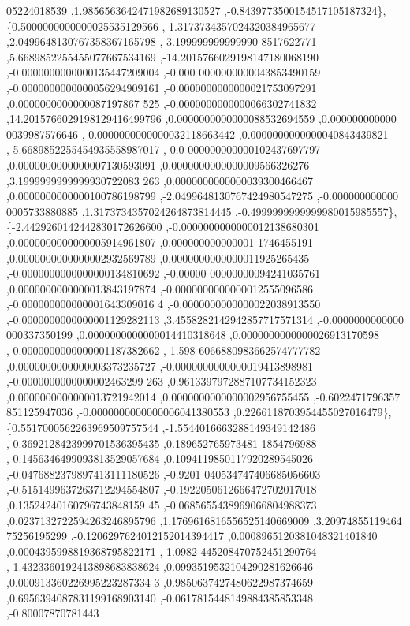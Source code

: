 \begin{DoxyCode}
      05224018539 ,1.9856563642471982689130527 ,-0.8439773500154517105187324\},
\{0.5000000000000025535129566 ,-1.3173734357024320384965677 ,2.0499648130767358367165798 ,-3.199999999999990
      8517622771 ,5.6689852255455077667534169 ,-14.2015766029198147180068190 ,-0.0000000000000135447209004 ,-0.000
      0000000000043853490159 ,-0.0000000000000056294909161 ,-0.0000000000000021753097291 ,0.0000000000000087197867
      525 ,-0.0000000000000066302741832 ,14.2015766029198129416499796 ,0.0000000000000088532694559 ,0.000000000000
      0039987576646 ,-0.0000000000000032118663442 ,0.0000000000000040843439821 ,-5.6689852255454935558987017 ,-0.0
      000000000000102437697797 ,0.0000000000000007130593091 ,0.0000000000000009566326276 ,3.1999999999999930722083
      263 ,0.0000000000000039300466467 ,0.0000000000000100786198799 ,-2.0499648130767424980547275 ,-0.000000000000
      0005733880885 ,1.3173734357024264873814445 ,-0.4999999999999980015985557\},
\{-2.4429260142442830172626600 ,-0.0000000000000012138680301 ,0.0000000000000005914961807 ,0.000000000000001
      1746455191 ,0.0000000000000002932569789 ,0.0000000000000011925265435 ,-0.0000000000000000134810692 ,-0.00000
      00000000094241035761 ,0.0000000000000013843197874 ,-0.0000000000000012555096586 ,-0.000000000000001643309016
      4 ,-0.0000000000000022038913550 ,-0.0000000000000001129282113 ,3.4558282142942857717571314 ,-0.0000000000000
      000337350199 ,0.0000000000000014410318648 ,0.0000000000000026913170598 ,-0.0000000000000001187382662 ,-1.598
      6066880983662574777782 ,0.0000000000000003373235727 ,-0.0000000000000019413898981 ,-0.0000000000000002463299
      263 ,0.9613397972887107734152323 ,0.0000000000000013721942014 ,0.0000000000000002956755455 ,-0.6022471796357
      851125947036 ,-0.0000000000000006041380553 ,0.2266118703954455027016479\},
\{0.5517000562263969509757544 ,-1.5544016663288149349142486 ,-0.3692128423999701536395435 ,0.189652765973481
      1854796988 ,-0.1456346499093813529057684 ,0.1094119850117920289545026 ,-0.0476882379897413111180526 ,-0.9201
      040534747406685056603 ,-0.5151499637263712294554807 ,-0.1922050612666472702017018 ,0.13524240160796743848159
      45 ,-0.0685655438969066804988373 ,0.0237132722594263246895796 ,1.1769616816556525140669009 ,3.20974855119464
      75256195299 ,-0.1206297624012152014394417 ,0.0008965120381048321401840 ,0.0004395998819368795822171 ,-1.0982
      445208470752451290764 ,-1.4323360192413898683838624 ,0.0993519532104290281626646 ,0.000913360226995223287334
      3 ,0.9850637427480622987374659 ,0.6956394087831199168903140 ,-0.0617815448149884385853348 ,-0.80007870781443

\end{DoxyCode}
